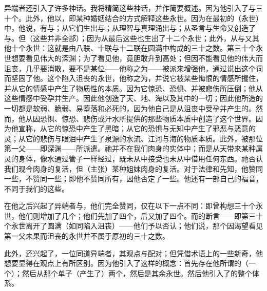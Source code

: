 异端者还引入了许多神话。我将精简这些神话，并作简要概述。因为他引入了与三十个。此外，他以，即某种婚姻结合的方式解释这些永世。因为在最初的（永世）中，他说，有与；从它们生出与；从理智与真理涌出与；从圣言与生命又创造了与。但（这些并非全部）；因为从最后这些也生出了十二个永世；此外，从与又其他十个永世：这就是由八联、十联与十二联在圆满中构成的三十之数。第三十个永世想要看见伟大的深渊；为了看见他，竟胆敢升到高处；但因不能看见他的伟大而沮丧，几乎要消散，要不是某位——他称之为——被派来增强他，通过说出这个词而坚固了他。这个陷入沮丧的永世，他称之为，并说它被某些悔恨的情感所攫住，并从它的情感中产生了物质性的本质。因为它惊恐、恐惧、并被悲伤所压倒；他从这些情感中受孕并生产。因此他创造了天、地、海以及其中的一切；因此他所造的一切都是软弱、脆弱、易堕落和必死的，因为他自己是从沮丧中受孕并产生的。然而，他从因恐惧、惊恐、悲伤或汗水所提供的那些物质本质中创造了这个世界。因为他宣称，从它的惊恐中产生了黑暗；从它的恐惧与无知中产生了邪恶与恶意的灵；从它的悲伤与眼泪中产生了泉源的水流、江河与海的物质本质。此外，被那位第一父——即深渊——所派遣。祂并不在我们肉身的实体中；而是从天带来某种属灵的身体，像水通过管子一样经过，既未从中接受也未从中借用任何东西。祂否认我们现今肉身的复活，但（主张）某种姐妹肉身的复活。对于法律和先知，他赞同一些，不赞同一些；即他不赞同所有，因他否定了一些。他还有一部自己的福音，不同于我们的这些。\par

在他之后兴起了异端者与，他们完全赞同，仅在以下一点不同：即曾构想三十个永世，他们则增加了几个；他们先加了四个，后又加了四个。而的断言——即第三十个永世离开了圆满（如同陷入沮丧）——他们予以否认；他们说，那个因渴望看见第一父未果而沮丧的永世并不属于原初的三十之数。\par

此外，还兴起了，一位同道异端者，其观点与配对；但凭借术语上的一些新奇，他想要显得在观点上有所区别。因为他引入了这样的概念：首先存在他所谓的（一个）；然后从那个单子（产生了）两个，然后是其余永世。然后他引入了的整个体系。\par


